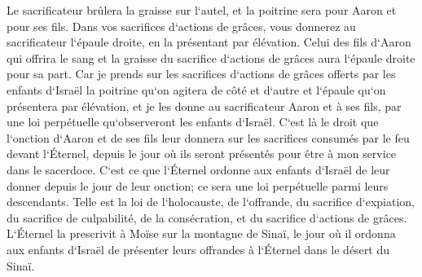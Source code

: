 \verse Le sacrificateur brûlera la graisse sur l`autel, et la poitrine sera pour Aaron et pour ses fils. 
\verse Dans vos sacrifices d`actions de grâces, vous donnerez au sacrificateur l`épaule droite, en la présentant par élévation. 
\verse Celui des fils d`Aaron qui offrira le sang et la graisse du sacrifice d`actions de grâces aura l`épaule droite pour sa part. 
\verse Car je prends sur les sacrifices d`actions de grâces offerts par les enfants d`Israël la poitrine qu`on agitera de côté et d`autre et l`épaule qu`on présentera par élévation, et je les donne au sacrificateur Aaron et à ses fils, par une loi perpétuelle qu`observeront les enfants d`Israël. 
\verse C`est là le droit que l`onction d`Aaron et de ses fils leur donnera sur les sacrifices consumés par le feu devant l`Éternel, depuis le jour où ils seront présentés pour être à mon service dans le sacerdoce. 
\verse C`est ce que l`Éternel ordonne aux enfants d`Israël de leur donner depuis le jour de leur onction; ce sera une loi perpétuelle parmi leurs descendants. 
\verse Telle est la loi de l`holocauste, de l`offrande, du sacrifice d`expiation, du sacrifice de culpabilité, de la consécration, et du sacrifice d`actions de grâces. 
\verse L`Éternel la prescrivit à Moïse sur la montagne de Sinaï, le jour où il ordonna aux enfants d`Israël de présenter leurs offrandes à l`Éternel dans le désert du Sinaï. 

\chapter{}

